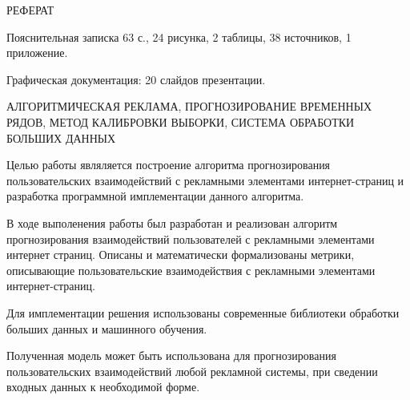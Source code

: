 \begin{center}
    РЕФЕРАТ    
\end{center}

Пояснительная записка 63 с., 24 рисунка, 2 таблицы, 38 источников, 1 приложение.

Графическая документация: 20 слайдов презентации.

АЛГОРИТМИЧЕСКАЯ РЕКЛАМА, ПРОГНОЗИРОВАНИЕ ВРЕМЕННЫХ РЯДОВ, МЕТОД КАЛИБРОВКИ ВЫБОРКИ, СИСТЕМА ОБРАБОТКИ
БОЛЬШИХ ДАННЫХ

Целью работы являляется построение алгоритма прогнозирования пользовательских взаимодействий
с рекламными элементами интернет-страниц и разработка программной имплементации данного
алгоритма.

В ходе выполенения работы был разработан и реализован алгоритм прогнозирования взаимодействий
пользователей с рекламными элементами интернет страниц. Описаны и математически формализованы
метрики, описывающие пользовательские взаимодействия с рекламными элементами интернет-страниц.

Для имплементации решения использованы современные библиотеки обработки больших данных 
и машинного обучения.

Полученная модель может быть использована для прогнозирования пользовательских взаимодействий
любой рекламной системы, при сведении входных данных к необходимой форме.

